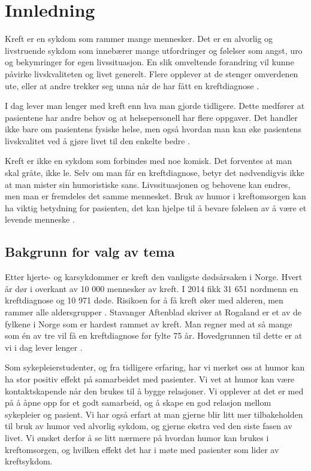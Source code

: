 \chapter{Innledning}

Kreft er en sykdom som rammer mange mennesker. Det er en alvorlig og
livstruende sykdom som innebærer mange utfordringer og følelser som angst, uro
og bekymringer for egen livssituasjon. En slik omveltende forandring vil kunne
påvirke livskvaliteten og livet generelt. Flere opplever at de stenger omverdenen
ute, eller at andre trekker seg unna når de har fått en kreftdiagnose
\cite{rustoen2008}.

I dag lever man lenger med kreft enn hva man gjorde tidligere. Dette medfører
at pasientene har andre behov og at helsepersonell har flere oppgaver. Det
handler ikke bare om pasientens fysiske helse, men også hvordan man kan øke
pasientens livskvalitet ved å gjøre livet til den enkelte bedre
\cite{rustoen2008}.

Kreft er ikke en sykdom som forbindes med noe komisk. Det forventes at man skal
gråte, ikke le. Selv om man får en kreftdiagnose, betyr det nødvendigvis ikke
at man mister sin humoristiske sans. Livssituasjonen og behovene kan endres,
men man er fremdeles det samme mennesket. Bruk av humor i kreftomsorgen kan ha
viktig betydning for pasienten, det kan hjelpe til å bevare følelsen av å være
et levende menneske \cite{wist2002}.

\section{Bakgrunn for valg av tema}

Etter hjerte- og karsykdommer er kreft den vanligste dødsårsaken i Norge. Hvert
år dør i overkant av 10 000 mennesker av kreft. I 2014 fikk 31 651 nordmenn en
kreftdiagnose og 10 971 døde. Risikoen for å få kreft øker med alderen, men
rammer alle aldersgrupper \cite{grasdal2016}. Stavanger Aftenblad skriver at
Rogaland er et av de fylkene i Norge som er hardest rammet av kreft. Man regner
med at så mange som én av tre vil få en kreftdiagnose før fylte 75 år.
Hovedgrunnen til dette er at vi i dag lever lenger \cite{haugan2015}.

Som sykepleierstudenter, og fra tidligere erfaring, har vi merket oss at humor
kan ha stor positiv effekt på samarbeidet med pasienter. Vi vet at humor kan
være kontaktskapende når den brukes til å bygge relasjoner. Vi opplever at det
er med på å åpne opp for et godt samarbeid, og å skape en god relasjon mellom
sykepleier og pasient. Vi har også erfart at man gjerne blir litt mer
tilbakeholden til bruk av humor ved alvorlig sykdom, og gjerne ekstra ved den
siste fasen av livet. Vi ønsket derfor å se litt nærmere på hvordan humor kan
brukes i kreftomsorgen, og hvilken effekt det har i møte med pasienter som
lider av kreftsykdom.

